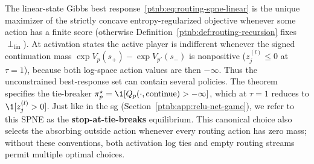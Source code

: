 \begin{remark}[Uniqueness]\label{ptnb:rem:routing-spne-uniqueness}
The linear-state Gibbs best response~\eqref{ptnb:eq:routing-spne-linear} is the unique maximizer of the
strictly concave entropy-regularized objective whenever some action has a finite score (otherwise
Definition~\ref{ptnb:def:routing-recursion} fixes $\perp_{\mathrm{lin}}$). At activation states the active player is indifferent whenever the signed continuation mass $\exp V_p(s_+) - \exp V_{p'}(s_-)$ is nonpositive ($z_j^{(l)}\leq0$ at $\tau=1$), because both log-space action values are then $-\infty$. Thus the unconstrained best-response set can contain several policies. The theorem specifies the
tie-breaker $\pi_p^\star = \1[Q_p(\cdot,\mathrm{continue}) > -\infty]$, which at $\tau=1$ reduces
to $\1[z_j^{(l)} > 0]$. Just like in the \ac{sg} (Section~\ref{ptnb:app:relu-net-game}), we refer to
this SPNE as the \textbf{stop-at-tie-breaks} equilibrium. This canonical choice also selects the absorbing outside action whenever every routing action has zero mass; without these conventions, both activation log ties and empty routing streams permit multiple optimal choices.
\end{remark}

